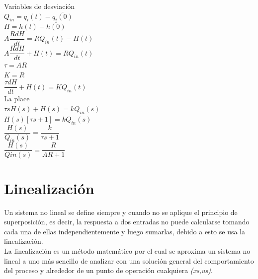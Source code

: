 \documentclass[a4paper,12pt,twoside]{proyectotanquesecci}
\begin{document}
Variables de desviación \\
$Q_{in}=q_{i}\left( t\right) -\overline {q_{i}\left( 0\right) }$ \\
$H=h\left( t\right) -\overline {h\left( 0\right) }$ \\

$A\dfrac {RdH}{dt}=RQ_{in}\left( t\right) -H\left( t\right)$ \\
$A\dfrac {RdH}{dt}+H\left( t\right) =RQ_{in}\left( t\right)$ \\
$\tau =AR$ \\
$K=R$ \\

$\dfrac {\tau dH}{dt}+H\left( t\right) =KQ_{in}\left( t\right)$ \\

La place \\
$\tau sH\left( s\right) +H\left( s\right) =kQ_{in}\left( s\right)$ \\
$H\left( s\right) \left[ \tau s+1\right] =kQ_{in}\left( s\right)$ \\
$\dfrac {H\left( s\right) }{Q_{in}\left( s\right) }=\dfrac {k}{\tau s+1}$ \\
$\dfrac {H\left( s\right) }{Qin\left( s\right) }=\dfrac {R}{AR+1}$ \\


\newpage




\section{Linealización}

Un sistema no lineal se define siempre y cuando no se aplique el principio de superposición, es decir, la respuesta a dos entradas no puede calcularse tomando cada una de ellas independientemente y luego sumarlas, debido a esto se usa la linealización.\\


La linealización es un método matemático por el cual se aproxima un sistema no lineal a uno más sencillo de analizar con una solución general del comportamiento del proceso y alrededor de un punto de operación cualquiera \textit{(xs,us)}.\\
\end{document}
